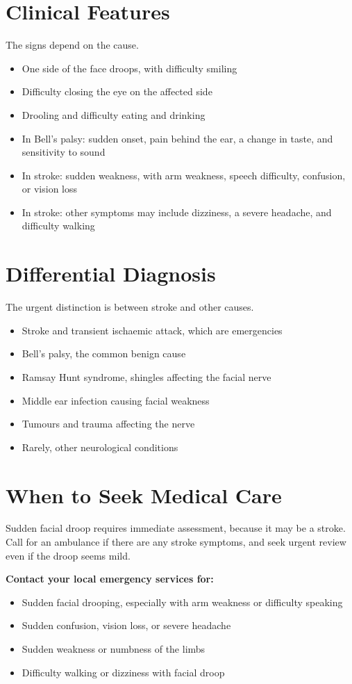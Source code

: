 \section*{Clinical Features}
The signs depend on the cause.
\begin{itemize}
    \item One side of the face droops, with difficulty smiling
    \item Difficulty closing the eye on the affected side
    \item Drooling and difficulty eating and drinking
    \item In Bell's palsy: sudden onset, pain behind the ear, a change in taste, and sensitivity to sound
    \item In stroke: sudden weakness, with arm weakness, speech difficulty, confusion, or vision loss
    \item In stroke: other symptoms may include dizziness, a severe headache, and difficulty walking
\end{itemize}

\section*{Differential Diagnosis}
The urgent distinction is between stroke and other causes.
\begin{itemize}
    \item Stroke and transient ischaemic attack, which are emergencies
    \item Bell's palsy, the common benign cause
    \item Ramsay Hunt syndrome, shingles affecting the facial nerve
    \item Middle ear infection causing facial weakness
    \item Tumours and trauma affecting the nerve
    \item Rarely, other neurological conditions
\end{itemize}

\section*{When to Seek Medical Care}
Sudden facial droop requires immediate assessment, because it may be a stroke. Call for an ambulance if there are any stroke symptoms, and seek urgent review even if the droop seems mild.

\textbf{Contact your local emergency services for:}
\begin{itemize}
    \item Sudden facial drooping, especially with arm weakness or difficulty speaking
    \item Sudden confusion, vision loss, or severe headache
    \item Sudden weakness or numbness of the limbs
    \item Difficulty walking or dizziness with facial droop
\end{itemize}

